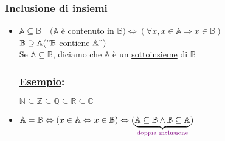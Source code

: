 \documentclass{article}
\newcommand{\ul}[1]{\underline{#1}}
\newcommand{\A}{\mathbb{A}}
\newcommand{\B}{\mathbb{B}}
\newcommand{\R}{\mathbb{R}}
\newcommand{\Esempio}[1]{\subsubsection*{\ul{Esempio}:}#1}
\newcommand{\colort}[2]{\text{\color{#1}#2}}
\begin{document}
\subsubsection*{\color{blue}\ul{Inclusione di insiemi}}
\begin{itemize}
	\item $\A\subseteq\B\quad(\A$ è contenuto in $\B)\Leftrightarrow(\forall x,x\in\A\Rightarrow x\in\B)$\\
	  {\color{violet}$\B\supseteq\A("\B$ contiene $\A")$}\\
	  Se $\A\subseteq\B$, diciamo che $\A$ è un \ul{sottoinsieme} di $\B$
	  \Esempio{$\mathbb{N}\subseteq\mathbb{Z}\subseteq\mathbb{Q}\subseteq\R\subseteq\mathbb{C}$}
	\item $\A=\B\Leftrightarrow(x\in\A\Leftrightarrow x\in\B)\Leftrightarrow(\underbrace{\A\subseteq\B\wedge\B\subseteq\A}_{\colort{violet}{doppia inclusione}})$
\end{itemize}
\end{document}
